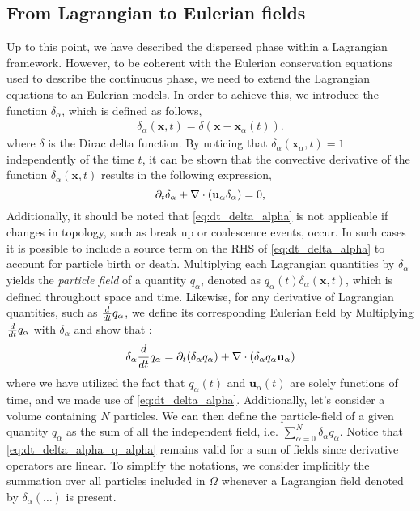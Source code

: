 \subsection{From Lagrangian to Eulerian fields}
Up to this point, we have described the dispersed phase within a Lagrangian framework.
However, to be coherent with the Eulerian conservation equations used to describe the continuous phase, we need to extend the Lagrangian equations to an Eulerian models. 
In order to achieve this, we introduce the function $\delta_\alpha$, which is defined as follows, 
\begin{align}
    \delta_\alpha(\textbf{x},t) = \delta(\textbf{x}-\textbf{x}_\alpha(t)).
    \label{eq:delta_alpha}
\end{align}
where $\delta$ is the Dirac delta function.
By noticing that $\delta_\alpha(\textbf{x}_\alpha,t) = 1$ independently of the time $t$, it can be shown that the convective derivative of the function $\delta_\alpha(\textbf{x},t)$ results in the following expression, 
\begin{equation}
    \partial_t \delta_\alpha
    + \mathbf{\nabla} \cdot (\textbf{u}_\alpha  \delta_\alpha)
    =0,
    \label{eq:dt_delta_alpha}
\end{equation}
Additionally, it should be noted that \ref{eq:dt_delta_alpha} is not applicable if changes in topology, such as break up or coalescence events, occur.
In such cases it is possible to include a source term on the RHS of \ref{eq:dt_delta_alpha} to account for particle birth or death. 
Multiplying each Lagrangian quantities by $\delta_\alpha$ yields the \textit{particle field} of a quantity $q_\alpha$, denoted as $q_\alpha(t)\delta_\alpha(\textbf{x},t)$, which is defined throughout space and time.
Likewise, for any derivative of Lagrangian quantities, such as $\frac{d}{d t} q_\alpha$, we define its corresponding Eulerian field by Multiplying $\frac{d}{d t} q_\alpha$ with $\delta_\alpha$ and show that :
\begin{equation}
    \delta_\alpha \frac{d}{d t} q_\alpha
    = \partial_t (\delta_\alpha q_\alpha)
    + \mathbf{\nabla} \cdot (\delta_\alpha q_\alpha \textbf{u}_\alpha)
    \label{eq:dt_delta_alpha_q_alpha}
\end{equation}
where we have utilized the fact that $q_\alpha(t)$ and $\textbf{u}_\alpha(t)$ are solely functions of time, and we made use of \ref{eq:dt_delta_alpha}.
Additionally, let's consider a volume containing $N$ particles.
We can then define the particle-field of a given quantity $q_\alpha$ as the sum of all the independent field, i.e. $\sum_{\alpha=0}^N \delta_\alpha q_\alpha$.
Notice that \ref{eq:dt_delta_alpha_q_alpha} remains valid for a sum of fields since derivative operators are linear.
To simplify the notations, we consider implicitly the summation over all particles included in $\Omega$ whenever a Lagrangian field denoted by $\delta_\alpha (\ldots)$ is present.

